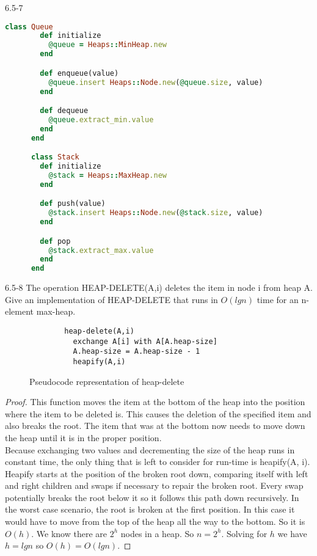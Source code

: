 \begin{problem}{6.5-7}
\begin{solution}
\begin{lstlisting}[language=Ruby]
      class Queue
        def initialize
          @queue = Heaps::MinHeap.new
        end

        def enqueue(value)
          @queue.insert Heaps::Node.new(@queue.size, value)
        end

        def dequeue
          @queue.extract_min.value
        end
      end

      class Stack
        def initialize
          @stack = Heaps::MaxHeap.new
        end

        def push(value)
          @stack.insert Heaps::Node.new(@stack.size, value)
        end

        def pop
          @stack.extract_max.value
        end
      end
    \end{lstlisting}
  \end{solution}
\end{problem}

\begin{problem}{6.5-8}
  The operation HEAP-DELETE(A,i) deletes the item in node i from heap A. Give an implementation of HEAP-DELETE that runs
  in $O(lgn)$ time for an n-element max-heap.
  \begin{solution}
    \begin{figure}[here]
      \caption{Pseudocode representation of heap-delete}
      \centering
      \begin{lstlisting}
        heap-delete(A,i)
          exchange A[i] with A[A.heap-size]
          A.heap-size = A.heap-size - 1
          heapify(A,i)
      \end{lstlisting}
    \end{figure}
    \begin{proof}
      This function moves the item at the bottom of the heap into the position where the item to be deleted is.
      This causes the deletion of the specified item and also breaks the root. The item that was at the bottom now needs
      to move down the heap until it is in the proper position. \\

      Because exchanging two values and decrementing the size of the heap runs in constant time, the only thing that is
      left to consider for run-time is heapify(A, i). \\

      Heapify starts at the position of the broken root down, comparing itself with left and right children
      and swaps if necessary to repair the broken root. Every swap potentially breaks the root below it so it follows this
      path down recursively. In the worst case scenario, the root is broken at the first position. In this case it would
      have to move from the top of the heap all the way to the bottom. So it is $O(h)$. We know there are $2^h$ nodes in a
      heap. So $n = 2^h$. Solving for $h$ we have $ h = lg n$ so $O(h) = O(lg n)$.
    \end{proof}
  \end{solution}
\end{problem}

